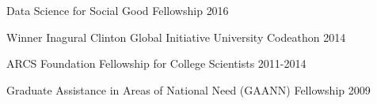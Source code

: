 



\begin{cvhonors}

  \cvhonor
    {} %
    {Data Science for Social Good Fellowship} %
    {} %
    {2016} %

  \cvhonor
    {} %
    {Winner Inagural Clinton Global Initiative University Codeathon} %
    {} %
    {2014} %

  \cvhonor
    {} %
    {ARCS Foundation Fellowship for College Scientists} %
    {} %
    {2011-2014} %


  \cvhonor
    {} %
    {Graduate Assistance in Areas of National Need (GAANN) Fellowship} %
    {} %
    {2009} %



\end{cvhonors}
